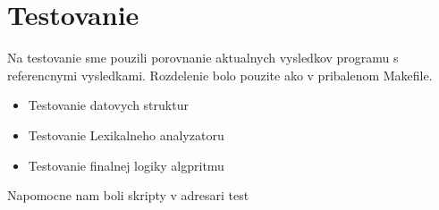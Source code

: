 \section{Testovanie}

Na testovanie sme pouzili porovnanie aktualnych vysledkov programu s referencnymi vysledkami.
Rozdelenie bolo pouzite ako v pribalenom Makefile.

\begin{itemize}
    \item Testovanie datovych struktur
    \item Testovanie Lexikalneho analyzatoru
    \item Testovanie finalnej logiky algpritmu
\end{itemize}

Napomocne nam boli skripty v adresari test